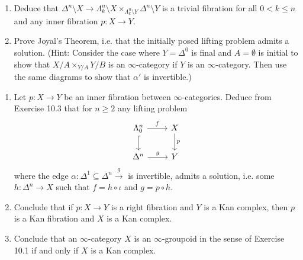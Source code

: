 \begin{Exercise}
\begin{enumerate}[label=(\alph*)]
		\item 
		Deduce that $ \Delta^n \setminus X  \to \Lambda_k^n \setminus X \times_{ \Lambda_k^n \setminus Y } \Delta^n \setminus Y $ is a trivial fibration for all $ 0 < k \leq n $ and any inner fibration $ p \colon X \to Y $.
		
		\item 
		Prove Joyal's Theorem, i.e. that the initially posed lifting problem admits a solution.
		\newline
		(Hint: Consider the case where $ Y = \Delta^0 $ is final and $ A = \emptyset $ is initial to show that $ X / A \times_{ Y / A } Y / B $ is an $\infty$-category if $ Y $ is an $ \infty $-category. Then use the same diagrams to show that $ \alpha' $ is invertible.) 
	\end{enumerate} 
\end{Exercise}

\begin{Exercise}
	\begin{enumerate}[label=(\alph*)]
		\item 
		Let $ p \colon X \to Y $ be an inner fibration between $ \infty $-categories. Deduce from Exercise 10.3 that for $ n \geq 2 $ any lifting problem 
		\[
		\begin{tikzcd}
			\Lambda_0^n 
			\ar[r, "f"]
			\ar[d, hook]
			&
			X
			\ar[d, "p"]
			\\
			\Delta^n 
			\ar[r, "g"]&
			Y
		\end{tikzcd}
		\]
		where the edge $ \alpha \colon \Delta^1 \subseteq \Delta^n \xrightarrow{ g } $ is invertible, admits a solution, i.e. some $ h \colon \Delta^n \to X $ such that $ f = h \circ \iota $ and $ g = p \circ h $.
		
		\item 
		Conclude that if $ p \colon X \to Y $ is a right fibration and $ Y $ is a Kan complex, then $ p $ is a Kan fibration and $ X $ is a Kan complex.
		
		\item 
		Conclude that an $ \infty $-category $ X $ is an $ \infty $-groupoid in the sense of Exercise 10.1 if and only if $ X $ is a Kan complex.
	\end{enumerate}
\end{Exercise}

